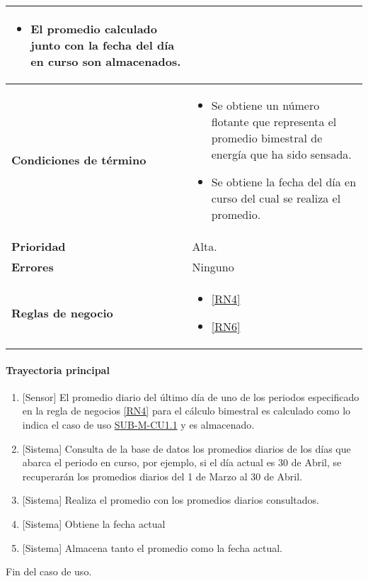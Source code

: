 \begin{longtable}{|J{5cm}|J{10.3cm}|}
\begin{itemize}
			\item El promedio calculado junto con la fecha del día en curso son almacenados.
		\end{itemize}\\ \hline
	\textbf{Condiciones de término} & 
		\begin{itemize}
			\item Se obtiene un número flotante que representa el promedio bimestral de energía que ha sido sensada.
			\item Se obtiene la fecha del día en curso del cual se realiza el promedio.
		\end{itemize} \\ \hline 
	\textbf{Prioridad} & 
		Alta. \\ \hline
	\textbf{Errores} & 
		Ninguno \\ \hline
	\textbf{Reglas de negocio} & 
		\begin{itemize}
			\item \ref{RN4}
			\item \ref{RN6}
		\end{itemize} \\ \hline

\end{longtable}

\paragraph{Trayectoria principal}
	\begin{enumerate}
		\item {[Sensor]} El promedio diario del último día de uno de los periodos especificado en la regla de negocios \ref{RN4} para el cálculo bimestral es calculado como lo indica el caso de uso \hyperref[SUB-M-CU1.1]{SUB-M-CU1.1} y es almacenado.
		\item  {[Sistema]} Consulta de la base de datos los promedios diarios de los días que abarca el periodo en curso, por ejemplo, si el día actual es 30 de Abril, se recuperarán los promedios diarios del 1 de Marzo al 30 de Abril.
		\item {[Sistema]} Realiza el promedio con los promedios diarios consultados.
		\item {[Sistema]} Obtiene la fecha actual
		\item {[Sistema]} Almacena tanto el promedio como la fecha actual.
	\end{enumerate}
	Fin del caso de uso.
